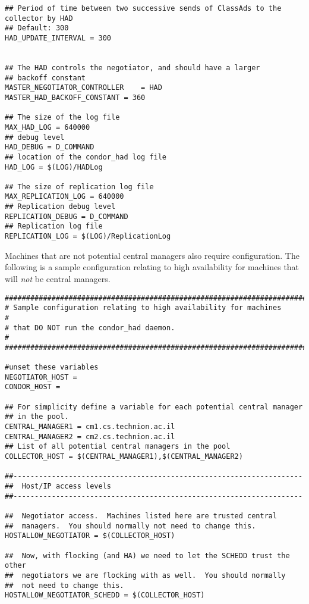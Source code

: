 \begin{verbatim}
## Period of time between two successive sends of ClassAds to the collector by HAD
## Default: 300
HAD_UPDATE_INTERVAL = 300


## The HAD controls the negotiator, and should have a larger
## backoff constant
MASTER_NEGOTIATOR_CONTROLLER	= HAD
MASTER_HAD_BACKOFF_CONSTANT	= 360

## The size of the log file
MAX_HAD_LOG = 640000
## debug level 
HAD_DEBUG = D_COMMAND
## location of the condor_had log file
HAD_LOG = $(LOG)/HADLog

## The size of replication log file
MAX_REPLICATION_LOG = 640000
## Replication debug level 
REPLICATION_DEBUG = D_COMMAND
## Replication log file
REPLICATION_LOG = $(LOG)/ReplicationLog

\end{verbatim}
\normalsize

Machines that are not potential central managers also 
require configuration.
The following is a sample configuration relating to
high availability for machines that will \emph{not} be central managers.

\footnotesize
\begin{verbatim}
##########################################################################
# Sample configuration relating to high availability for machines        # 
# that DO NOT run the condor_had daemon.                                 #
##########################################################################

#unset these variables 
NEGOTIATOR_HOST =
CONDOR_HOST =

## For simplicity define a variable for each potential central manager
## in the pool. 
CENTRAL_MANAGER1 = cm1.cs.technion.ac.il
CENTRAL_MANAGER2 = cm2.cs.technion.ac.il
## List of all potential central managers in the pool
COLLECTOR_HOST = $(CENTRAL_MANAGER1),$(CENTRAL_MANAGER2)

##--------------------------------------------------------------------
##  Host/IP access levels
##--------------------------------------------------------------------

##  Negotiator access.  Machines listed here are trusted central
##  managers.  You should normally not need to change this.
HOSTALLOW_NEGOTIATOR = $(COLLECTOR_HOST)

##  Now, with flocking (and HA) we need to let the SCHEDD trust the other 
##  negotiators we are flocking with as well.  You should normally 
##  not need to change this.
HOSTALLOW_NEGOTIATOR_SCHEDD = $(COLLECTOR_HOST) 
\end{verbatim}
\normalsize

